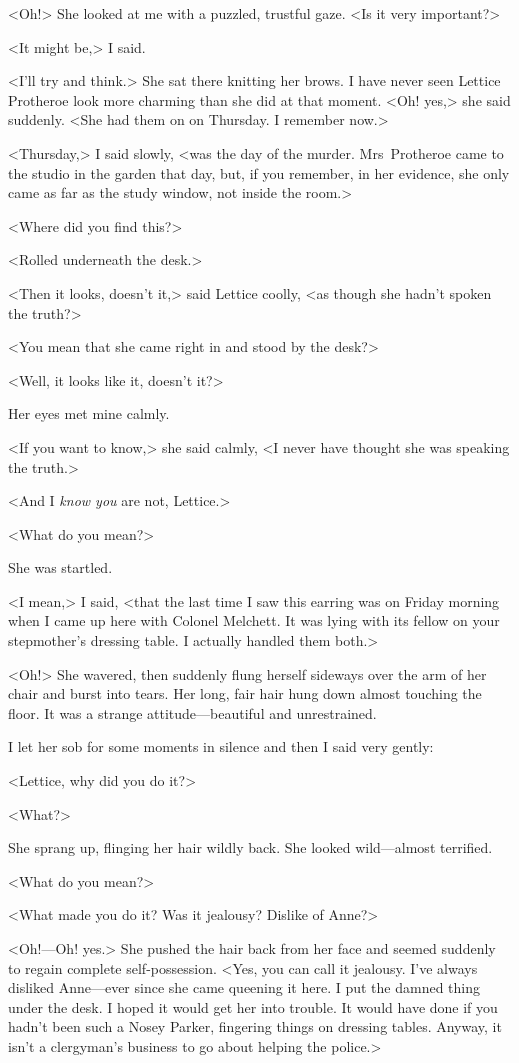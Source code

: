 <Oh!> She looked at me with a puzzled, trustful gaze. <Is it very important?>

<It might be,> I said.

<I'll try and think.> She sat there knitting her brows. I have never seen Lettice Protheroe look more charming than she did at that moment. <Oh! yes,> she said suddenly. <She had them on on Thursday. I remember now.>

<Thursday,> I said slowly, <was the day of the murder. Mrs~Protheroe came to the studio in the garden that day, but, if you remember, in her evidence, she only came as far as the study window, not inside the room.>

<Where did you find this?>

<Rolled underneath the desk.>

<Then it looks, doesn't it,> said Lettice coolly, <as though she hadn't spoken the truth?>

<You mean that she came right in and stood by the desk?>

<Well, it looks like it, doesn't it?>

Her eyes met mine calmly.

<If you want to know,> she said calmly, <I never have thought she was speaking the truth.>

<And I \emph{know you} are not, Lettice.>

<What do you mean?>

She was startled.

<I mean,> I said, <that the last time I saw this earring was on Friday morning when I came up here with Colonel Melchett. It was lying with its fellow on your stepmother's dressing table. I actually handled them both.>

<Oh!\longdash> She wavered, then suddenly flung herself sideways over the arm of her chair and burst into tears. Her long, fair hair hung down almost touching the floor. It was a strange attitude—beautiful and unrestrained.

I let her sob for some moments in silence and then I said very gently:

<Lettice, why did you do it?>

<What?>

She sprang up, flinging her hair wildly back. She looked wild—almost terrified.

<What do you mean?>

<What made you do it? Was it jealousy? Dislike of Anne?>

<Oh!—Oh! yes.> She pushed the hair back from her face and seemed suddenly to regain complete self-possession. <Yes, you can call it jealousy. I've always disliked Anne—ever since she came queening it here. I put the damned thing under the desk. I hoped it would get her into trouble. It would have done if you hadn't been such a Nosey Parker, fingering things on dressing tables. Anyway, it isn't a clergyman's business to go about helping the police.>

